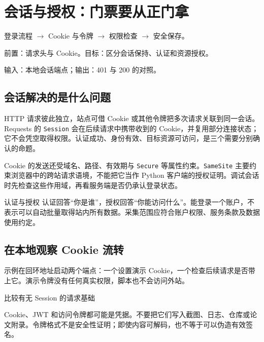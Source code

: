 \chapter{会话与授权：门票要从正门拿}\label{ch:sessions}
\begin{tcolorbox}[title=章首知识地图,colframe=Ink]
登录流程 $\longrightarrow$ Cookie 与令牌 $\longrightarrow$ 权限检查 $\longrightarrow$ 安全保存。
\end{tcolorbox}

\begin{tcolorbox}[title=学习目标与前置知识,colframe=Ink!65,colback=Ink!2]
前置：请求头与 Cookie。目标：区分会话保持、认证和资源授权。\par
输入：本地会话端点；输出：401 与 200 的对照。
\end{tcolorbox}

\section{会话解决的是什么问题}
HTTP 请求彼此独立，站点可借 Cookie 或其他令牌把多次请求关联到同一会话。Requests 的 \texttt{Session} 会在后续请求中携带收到的 Cookie，并复用部分连接状态；它不会凭空取得权限。认证成功、身份有效、目标资源可访问，是三个需要分别确认的命题。

Cookie 的发送还受域名、路径、有效期与 \texttt{Secure} 等属性约束。\texttt{SameSite} 主要约束浏览器中的跨站请求语境，不能把它当作 Python 客户端的授权证明。调试会话时先检查这些作用域，再看服务端是否仍承认登录状态。

\begin{definition}{认证与授权}
认证回答“你是谁”，授权回答“你能访问什么”。能登录一个账户，不表示可以自动批量取得站内所有数据。采集范围应符合账户权限、服务条款及数据使用约定。
\end{definition}

\section{在本地观察 Cookie 流转}
示例在回环地址启动两个端点：一个设置演示 Cookie，一个检查后续请求是否带上它。演示令牌没有任何真实权限，脚本也不会访问外站。

\begin{example}{比较有无 Session 的请求}{基础}
\end{example}

\begin{warning}
Cookie、JWT 和访问令牌都可能是凭据。不要把它们写入截图、日志、仓库或论文附录。令牌格式不是安全性证明；即使内容可解码，也不等于可以伪造有效签名。
\end{warning}

